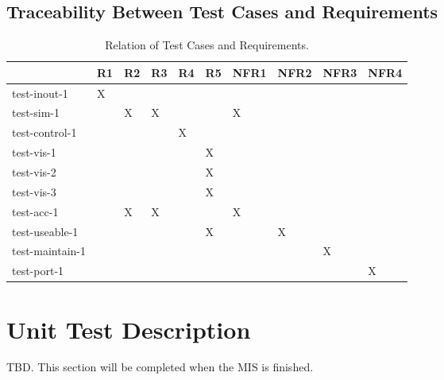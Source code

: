 \documentclass[12pt, titlepage]{article}
\begin{document}
\subsection{Traceability Between Test Cases and Requirements}

\begin{table}[!h]
  \centering
  \caption{Relation of Test Cases and Requirements.}
  \label{tab:traceability}
  \begin{tabular}{|l|l|l|l|l|l|l|l|l|l|}
    \hline
                    & R1 & R2 & R3 & R4 & R5 & NFR1 & NFR2 & NFR3 & NFR4 \\ \hline
    test-inout-1    & X  &    &    &    &    &      &      &      &      \\ \hline
    test-sim-1      &    & X  & X  &    &    &  X   &      &      &      \\ \hline
    test-control-1  &    &    &    & X  &    &      &      &      &      \\ \hline
    test-vis-1      &    &    &    &    & X  &      &      &      &      \\ \hline
    test-vis-2      &    &    &    &    & X  &      &      &      &      \\ \hline
    test-vis-3      &    &    &    &    & X  &      &      &      &      \\ \hline
    test-acc-1      &    &  X &  X &    &    &  X   &      &      &      \\ \hline
    test-useable-1  &    &    &    &    &  X &      &  X   &      &      \\ \hline
    test-maintain-1 &    &    &    &    &    &      &      &  X   &      \\ \hline
    test-port-1     &    &    &    &    &    &      &      &      &  X   \\ \hline
  \end{tabular}
\end{table}


\section{Unit Test Description} \label{unit_test}

TBD. This section will be completed when the MIS is finished.

\end{document}
